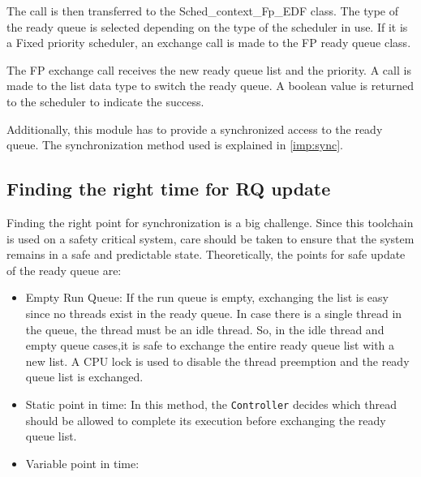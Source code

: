 The call is then transferred to the Sched\_context\_Fp\_EDF class. The type of the ready queue is selected depending on the type of the scheduler in use. If it is a Fixed priority scheduler, an exchange call is made to the FP ready queue class. 

The FP exchange call receives the new ready queue list and the priority. A call is made to the list data type to switch the ready queue. A boolean value is returned to the scheduler to indicate the success.

Additionally, this module has to provide a synchronized access to the ready queue. The synchronization method used is explained in \ref{imp:sync}. 

\subsection{Finding the right time for RQ update}
Finding the right point for synchronization is a big challenge. Since this toolchain is used on a safety critical system, care should be taken to ensure that the system remains in a safe and predictable state. Theoretically, the points for safe update of the ready queue are:

\begin{itemize}
\item Empty Run Queue: If the run queue is empty, exchanging the list is easy since no threads exist in the ready queue. In case there is a single thread in the queue, the thread must be an idle thread. So, in the idle thread and empty queue cases,it is safe to exchange the entire ready queue list with a new list. A CPU lock is used to disable the thread preemption and the ready queue list is exchanged.

\item Static point in time: In this method, the \texttt{Controller} decides which thread should be allowed to complete its execution before exchanging the ready queue list. 

\item Variable point in time: 
\end{itemize}
